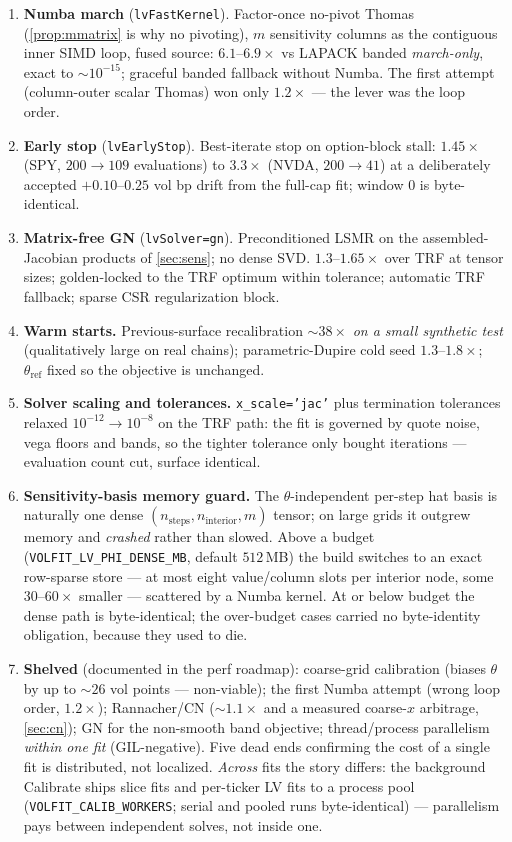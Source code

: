 \documentclass[11pt]{article}
\begin{document}
\begin{enumerate}[leftmargin=1.6em]
\item \textbf{Numba march} (\texttt{lvFastKernel}).  Factor-once no-pivot
Thomas (\cref{prop:mmatrix} is why no pivoting), $m$ sensitivity columns as
the contiguous inner SIMD loop, fused source: $6.1$--$6.9\times$ vs LAPACK
banded \emph{march-only}, exact to $\sim10^{-15}$; graceful banded fallback
without Numba.  The first attempt (column-outer scalar Thomas) won only
$1.2\times$ --- the lever was the loop order.
\item \textbf{Early stop} (\texttt{lvEarlyStop}).  Best-iterate stop on
option-block stall: $1.45\times$ (SPY, $200\to109$ evaluations) to
$3.3\times$ (NVDA, $200\to41$) at a deliberately accepted
$+0.10$--$0.25$ vol bp drift from the full-cap fit; window $0$ is
byte-identical.
\item \textbf{Matrix-free GN} (\texttt{lvSolver=gn}).  Preconditioned LSMR
on the assembled-Jacobian products of \cref{sec:sens}; no dense SVD.
$1.3$--$1.65\times$ over TRF at tensor sizes; golden-locked to the TRF
optimum within tolerance; automatic TRF fallback; sparse CSR regularization
block.
\item \textbf{Warm starts.}  Previous-surface recalibration
$\sim38\times$ \emph{on a small synthetic test} (qualitatively large on
real chains); parametric-Dupire cold seed $1.3$--$1.8\times$;
$\theta_{\text{ref}}$ fixed so the objective is unchanged.
\item \textbf{Solver scaling and tolerances.}  \texttt{x\_scale='jac'} plus
termination tolerances relaxed $10^{-12}\to10^{-8}$ on the TRF path: the
fit is governed by quote noise, vega floors and bands, so the tighter
tolerance only bought iterations --- evaluation count cut, surface
identical.
\item \textbf{Sensitivity-basis memory guard.}  The $\theta$-independent
per-step hat basis is naturally one dense
$(n_{\text{steps}},n_{\text{interior}},m)$ tensor; on large grids it
outgrew memory and \emph{crashed} rather than slowed.  Above a budget
(\texttt{VOLFIT\_LV\_PHI\_DENSE\_MB}, default $512$\,MB) the build switches
to an exact row-sparse store --- at most eight value/column slots per
interior node, some $30$--$60\times$ smaller --- scattered by a Numba
kernel.  At or below budget the dense path is byte-identical; the
over-budget cases carried no byte-identity obligation, because they used
to die.
\item \textbf{Shelved} (documented in the perf roadmap): coarse-grid
calibration (biases $\theta$ by up to $\sim26$ vol points ---
non-viable); the first Numba attempt (wrong loop order, $1.2\times$);
Rannacher/CN ($\sim1.1\times$ and a measured coarse-$x$ arbitrage,
\cref{sec:cn}); GN for the non-smooth band objective; thread/process
parallelism \emph{within one fit} (GIL-negative).  Five dead ends
confirming the cost of a single fit is distributed, not localized.
\emph{Across} fits the story differs: the background Calibrate ships slice
fits and per-ticker LV fits to a process pool
(\texttt{VOLFIT\_CALIB\_WORKERS}; serial and pooled runs byte-identical)
--- parallelism pays between independent solves, not inside one.
\end{enumerate}
\end{document}
